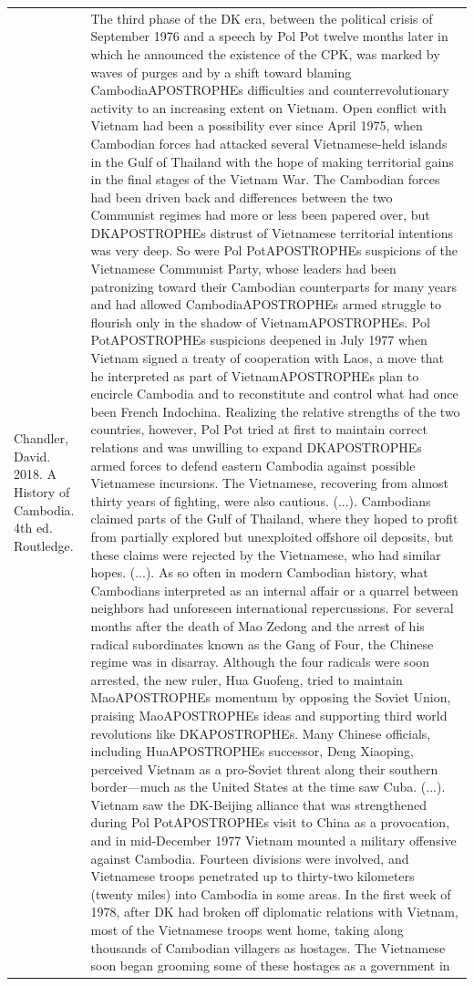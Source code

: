 {\begin{longtable}{p{}p{}}
Chandler, David. 2018. A History of Cambodia. 4th ed. Routledge. & The third phase of the DK era, between the political crisis of September 1976 and a speech by Pol Pot twelve months later in which he announced the existence of the CPK, was marked by waves of purges and by a shift toward blaming CambodiaAPOSTROPHEs difficulties and counterrevolutionary activity to an increasing extent on Vietnam. Open conflict with Vietnam had been a possibility ever since April 1975, when Cambodian forces had attacked several Vietnamese-held islands in the Gulf of Thailand with the hope of making territorial gains in the final stages of the Vietnam War. The Cambodian forces had been driven back and differences between the two Communist regimes had more or less been papered over, but DKAPOSTROPHEs distrust of Vietnamese territorial intentions was very deep. So were Pol PotAPOSTROPHEs suspicions of the Vietnamese Communist Party, whose leaders had been patronizing toward their Cambodian counterparts for many years and had allowed CambodiaAPOSTROPHEs armed struggle to flourish only in the shadow of VietnamAPOSTROPHEs. Pol PotAPOSTROPHEs suspicions deepened in July 1977 when Vietnam signed a treaty of cooperation with Laos, a move that he interpreted as part of VietnamAPOSTROPHEs plan to encircle Cambodia and to reconstitute and control what had once been French Indochina. Realizing the relative strengths of the two countries, however, Pol Pot tried at first to maintain correct relations and was unwilling to expand DKAPOSTROPHEs armed forces to defend eastern Cambodia against possible Vietnamese incursions. The Vietnamese, recovering from almost thirty years of fighting, were also cautious. (...). Cambodians claimed parts of the Gulf of Thailand, where they hoped to profit from partially explored but unexploited offshore oil deposits, but these claims were rejected by the Vietnamese, who had similar hopes. (...). As so often in modern Cambodian history, what Cambodians interpreted as an internal affair or a quarrel between neighbors had unforeseen international repercussions. For several months after the death of Mao Zedong and the arrest of his radical subordinates known as the Gang of Four, the Chinese regime was in disarray. Although the four radicals were soon arrested, the new ruler, Hua Guofeng, tried to maintain MaoAPOSTROPHEs momentum by opposing the Soviet Union, praising MaoAPOSTROPHEs ideas and supporting third world revolutions like DKAPOSTROPHEs. Many Chinese officials, including HuaAPOSTROPHEs successor, Deng Xiaoping, perceived Vietnam as a pro-Soviet threat along their southern border—much as the United States at the time saw Cuba. (...). Vietnam saw the DK-Beijing alliance that was strengthened during Pol PotAPOSTROPHEs visit to China as a provocation, and in mid-December 1977 Vietnam mounted a military offensive against Cambodia. Fourteen divisions were involved, and Vietnamese troops penetrated up to thirty-two kilometers (twenty miles) into Cambodia in some areas. In the first week of 1978, after DK had broken off diplomatic relations with Vietnam, most of the Vietnamese troops went home, taking along thousands of Cambodian villagers as hostages. The Vietnamese soon began grooming some of these hostages as a government in 
\end{longtable}}
